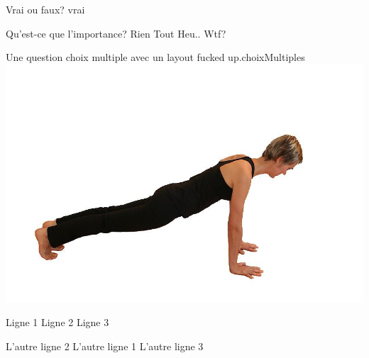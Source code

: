 \documentclass[letterpaper,12pt]{article}
\begin{document}
\begin{questions}
  
  
  \begin{vraiOuFaux}
    {Vrai ou faux?}
    {vrai}
  \end{vraiOuFaux}
  
  
  
  

  \begin{choixMultiples}{Qu'est-ce que l'importance?} 
      \reponse	Rien
      \reponse	Tout
      \bonneReponse Heu.. Wtf?
  \end{choixMultiples}
  
  \begin{customQuestion}{Une question choix multiple avec un layout fucked up.}{choixMultiples}
    { %
      \centering
      \includegraphics[width=.2\linewidth]{uneImage.jpg}
      \label{fig:uneImage}      
    }
    \vspace{15px}
    \begin{minipage}{.46\linewidth}
      \begin{enumerate}
       \reponse	Ligne 1
       \reponse	Ligne 2
       \reponse	Ligne 3
      \end{enumerate}
    \end{minipage}
    \hspace{15px}\begin{minipage}{.35\linewidth}
      \begin{itemize}
      \renewcommand\labelitemi{\rule{30px}{1px}}
       \reponse	{} L'autre ligne 2
       \reponse	{} L'autre ligne 1
       \reponse	{} L'autre ligne 3
      \end{itemize}
    \end{minipage}
  \end{customQuestion}



\end{questions}
\end{document}
